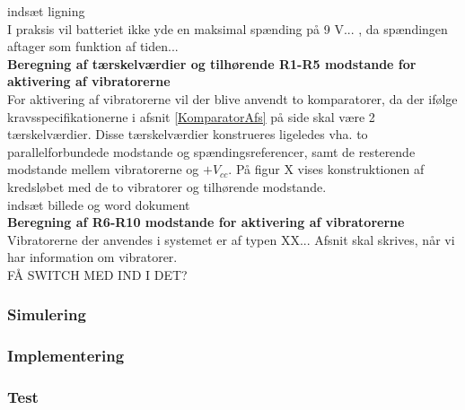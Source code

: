 indsæt ligning \\

I praksis vil batteriet ikke yde en maksimal spænding på 9 V... , da spændingen aftager som funktion af tiden... \\

\noindent\textbf{Beregning af tærskelværdier og tilhørende R1-R5 modstande for aktivering af  vibratorerne} \\
For aktivering af vibratorerne vil der blive anvendt to komparatorer, da der ifølge kravsspecifikationerne i afsnit \ref{KomparatorAfs} på side \pageref{KomparatorAfs} skal være 2 tærskelværdier. Disse tærskelværdier konstrueres ligeledes vha. to parallelforbundede modstande og spændingsreferencer, samt de resterende modstande mellem vibratorerne og $+V_{cc}$. På figur X vises konstruktionen af kredsløbet med de to vibratorer og tilhørende modstande. \\

indsæt billede og word dokument \\

\noindent\textbf{Beregning af R6-R10 modstande for aktivering af vibratorerne} \\
Vibratorerne der anvendes i systemet er af typen XX... Afsnit skal skrives, når vi har information om vibratorer.  \\

FÅ SWITCH MED IND I DET? \\

\subsubsection{Simulering}
\subsubsection{Implementering}
\subsubsection{Test}